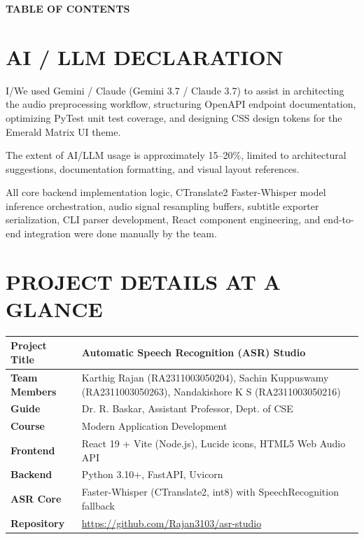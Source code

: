 \documentclass[11pt,a4paper]{article}
\begin{document}
\begin{center}
{\Large\bfseries TABLE OF CONTENTS}
\end{center}
\vspace{4pt}
\renewcommand{\contentsname}{}
\vspace{-1.2cm}
\setcounter{tocdepth}{1}
\tableofcontents
\thispagestyle{fancy}

\clearpage
\section*{AI / LLM DECLARATION}
I/We used Gemini / Claude (Gemini 3.7 / Claude 3.7) to assist in architecting the audio preprocessing workflow, structuring OpenAPI endpoint documentation, optimizing PyTest unit test coverage, and designing CSS design tokens for the Emerald Matrix UI theme.

The extent of AI/LLM usage is approximately 15--20\%, limited to architectural suggestions, documentation formatting, and visual layout references.

All core backend implementation logic, CTranslate2 Faster-Whisper model inference orchestration, audio signal resampling buffers, subtitle exporter serialization, CLI parser development, React component engineering, and end-to-end integration were done manually by the team.

\vspace{10pt}
\section*{PROJECT DETAILS AT A GLANCE}
\begin{tabularx}{\textwidth}{|>{\bfseries}L{4.2cm}|Y|}
\hline
Project Title & Automatic Speech Recognition (ASR) Studio \\ \hline
Team Members & Karthig Rajan (RA2311003050204), Sachin Kuppuswamy (RA2311003050263), Nandakishore K S (RA2311003050216) \\ \hline
Guide & Dr. R. Baskar, Assistant Professor, Dept. of CSE \\ \hline
Course & Modern Application Development \\ \hline
Frontend & React 19 + Vite (Node.js), Lucide icons, HTML5 Web Audio API \\ \hline
Backend & Python 3.10+, FastAPI, Uvicorn \\ \hline
ASR Core & Faster-Whisper (CTranslate2, int8) with SpeechRecognition fallback \\ \hline
Repository & \url{https://github.com/Rajan3103/asr-studio} \\ \hline
\end{tabularx}
\end{document}
